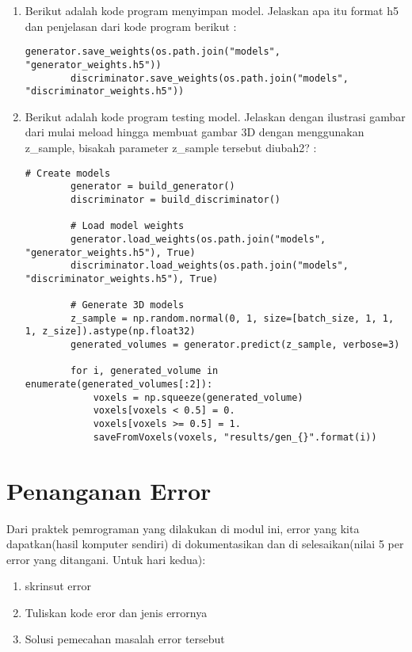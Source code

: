 \begin{enumerate}
\item
Berikut adalah kode program menyimpan model. Jelaskan apa itu format h5 dan penjelasan dari kode program berikut :
\begin{lstlisting}[caption=Simpan model,label={lst:8.15}]
        generator.save_weights(os.path.join("models", "generator_weights.h5"))
        discriminator.save_weights(os.path.join("models", "discriminator_weights.h5"))
\end{lstlisting}

\item
Berikut adalah kode program testing model. Jelaskan dengan ilustrasi gambar dari mulai meload hingga membuat gambar 3D dengan menggunakan z\_sample, bisakah parameter z\_sample tersebut diubah2? :
\begin{lstlisting}[caption=Testing model,label={lst:8.16}]
        # Create models
        generator = build_generator()
        discriminator = build_discriminator()

        # Load model weights
        generator.load_weights(os.path.join("models", "generator_weights.h5"), True)
        discriminator.load_weights(os.path.join("models", "discriminator_weights.h5"), True)

        # Generate 3D models
        z_sample = np.random.normal(0, 1, size=[batch_size, 1, 1, 1, z_size]).astype(np.float32)
        generated_volumes = generator.predict(z_sample, verbose=3)

        for i, generated_volume in enumerate(generated_volumes[:2]):
            voxels = np.squeeze(generated_volume)
            voxels[voxels < 0.5] = 0.
            voxels[voxels >= 0.5] = 1.
            saveFromVoxels(voxels, "results/gen_{}".format(i))
\end{lstlisting}

\end{enumerate}

\section{Penanganan Error}
Dari praktek pemrograman yang dilakukan di modul ini, error yang kita dapatkan(hasil komputer sendiri) di dokumentasikan dan di selesaikan(nilai 5 per error yang ditangani. Untuk hari kedua):

\begin{enumerate}
	\item skrinsut error
	\item Tuliskan kode eror dan jenis errornya
	\item Solusi pemecahan masalah error tersebut
\end{enumerate}

